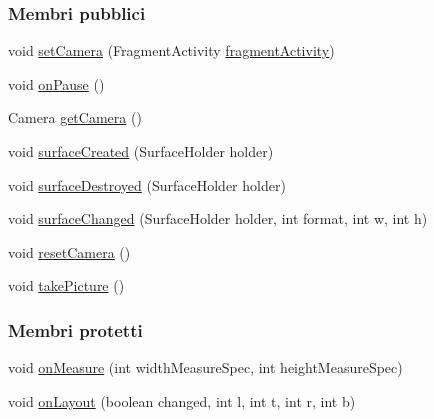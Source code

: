 \subsubsection*{Membri pubblici}
\begin{DoxyCompactItemize}
\item 
void \hyperlink{classit_1_1unibo_1_1torsello_1_1bluetoothpositioning_1_1examplesCamera_1_1Preview_a018960081707cd70025fb4b7e0322162_a018960081707cd70025fb4b7e0322162}{set\+Camera} (Fragment\+Activity \hyperlink{classit_1_1unibo_1_1torsello_1_1bluetoothpositioning_1_1examplesCamera_1_1Preview_afb962539b64017465860fcbf9a903370_afb962539b64017465860fcbf9a903370}{fragment\+Activity})
\item 
void \hyperlink{classit_1_1unibo_1_1torsello_1_1bluetoothpositioning_1_1examplesCamera_1_1Preview_af63fabacd267ab2763cc3183464dbf47_af63fabacd267ab2763cc3183464dbf47}{on\+Pause} ()
\item 
Camera \hyperlink{classit_1_1unibo_1_1torsello_1_1bluetoothpositioning_1_1examplesCamera_1_1Preview_a8bc995f4776255800f64dfb94d38e47d_a8bc995f4776255800f64dfb94d38e47d}{get\+Camera} ()
\item 
void \hyperlink{classit_1_1unibo_1_1torsello_1_1bluetoothpositioning_1_1examplesCamera_1_1Preview_afff805882286610f41ac1cb33e19abdc_afff805882286610f41ac1cb33e19abdc}{surface\+Created} (Surface\+Holder holder)
\item 
void \hyperlink{classit_1_1unibo_1_1torsello_1_1bluetoothpositioning_1_1examplesCamera_1_1Preview_abed0494890fb81c8db6d62a28b20434b_abed0494890fb81c8db6d62a28b20434b}{surface\+Destroyed} (Surface\+Holder holder)
\item 
void \hyperlink{classit_1_1unibo_1_1torsello_1_1bluetoothpositioning_1_1examplesCamera_1_1Preview_a05b0be70607a79a5cc710bdb8f9710c8_a05b0be70607a79a5cc710bdb8f9710c8}{surface\+Changed} (Surface\+Holder holder, int format, int w, int h)
\item 
void \hyperlink{classit_1_1unibo_1_1torsello_1_1bluetoothpositioning_1_1examplesCamera_1_1Preview_a26bdf3a50e5e5044510f2ba1583ce8d8_a26bdf3a50e5e5044510f2ba1583ce8d8}{reset\+Camera} ()
\item 
void \hyperlink{classit_1_1unibo_1_1torsello_1_1bluetoothpositioning_1_1examplesCamera_1_1Preview_afa7f533cc47be1bf7be2b1d1bfa43600_afa7f533cc47be1bf7be2b1d1bfa43600}{take\+Picture} ()
\end{DoxyCompactItemize}
\subsubsection*{Membri protetti}
\begin{DoxyCompactItemize}
\item 
void \hyperlink{classit_1_1unibo_1_1torsello_1_1bluetoothpositioning_1_1examplesCamera_1_1Preview_a0006f057eb17dbcbd9555144009c6947_a0006f057eb17dbcbd9555144009c6947}{on\+Measure} (int width\+Measure\+Spec, int height\+Measure\+Spec)
\item 
void \hyperlink{classit_1_1unibo_1_1torsello_1_1bluetoothpositioning_1_1examplesCamera_1_1Preview_a93af42647109198d02609680760ef465_a93af42647109198d02609680760ef465}{on\+Layout} (boolean changed, int l, int t, int r, int b)
\end{DoxyCompactItemize}
